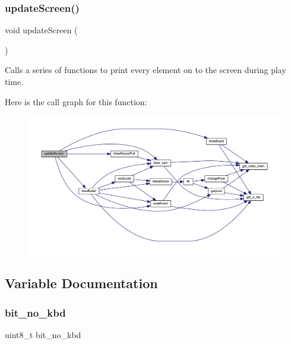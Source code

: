 \subsubsection{\texorpdfstring{updateScreen()}{updateScreen()}}
{\footnotesize\ttfamily void update\+Screen (\begin{DoxyParamCaption}{ }\end{DoxyParamCaption})}



Calls a series of functions to print every element on to the screen during play time. 

Here is the call graph for this function\+:
\nopagebreak
\begin{figure}[H]
\begin{center}
\leavevmode
\includegraphics[width=350pt]{group__game_ga192a0a30e5705be3b2800eb7172aa6d4_cgraph}
\end{center}
\end{figure}


\subsection{Variable Documentation}
\mbox{\label{group__game_ga6d6813b4ed3fe31a49b13b3cd616beb5}} 
\subsubsection{\texorpdfstring{bit\_no\_kbd}{bit\_no\_kbd}}
{\footnotesize\ttfamily uint8\+\_\+t bit\+\_\+no\+\_\+kbd}

\mbox{\label{group__game_ga3553354293e11c5cd620f549a9b0125d}} 
